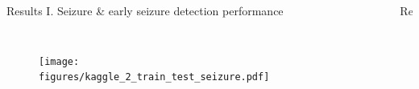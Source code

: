 \documentclass[final,t,overlay, xcolor=table, sans, mathserif]{beamer}
\begin{document}
\begin{frame}{}
\begin{columns}[t]
\begin{column}{.65\linewidth}
\vspace{-1.2cm}
\begin{columns}
\begin{block}{Results I. Seizure \& early seizure detection performance}
\begin{columns}
\vspace{-1cm}
\begin{figure}
\texttt{[image: figures/kaggle\_2\_train\_test\_seizure.pdf]}
\end{figure}
\vspace{-1cm}
\begin{figure}
\includegraphics[width=1\textwidth]{figures/kaggle_2_train_test_early.pdf}
\end{figure}
\end{columns}
\end{block}
\begin{block}{Results III. Seizrue prediction performance}
\begin{columns}
\vspace{-1cm}
\begin{figure}
\texttt{[image: figures/kaggle\_prediction\_seizure.pdf]}
\end{figure}
\begin{itemize}
\item We run the same analysis
\item Overall performance drops significantly
\end{itemize}
\end{columns}
\end{block}
\end{columns}


\end{column}
\end{columns}
\end{frame}
\end{document}
